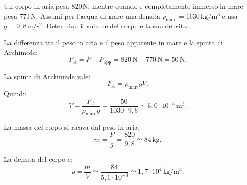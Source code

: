 
\begin{esercizio}
Un corpo in aria pesa $820\,\mathrm{N}$, mentre quando e completamente immerso in mare pesa
$770\,\mathrm{N}$. Assumi per l'acqua di mare una densita
$\rho_{\text{mare}}=1030\,\mathrm{kg/m^3}$ e usa $g=9{,}8\,\mathrm{m/s^2}$.
Determina il volume del corpo e la sua densita.
\end{esercizio}

\begin{soluzione}
La differenza tra il peso in aria e il peso apparente in mare e la spinta di
Archimede:
\[
F_A=P-P_\text{app}
=820\,\mathrm{N}-770\,\mathrm{N}
=50\,\mathrm{N}.
\]

La spinta di Archimede vale:
\[
F_A=\rho_\text{mare}gV.
\]
Quindi:
\[
V=\frac{F_A}{\rho_\text{mare}g}
=\frac{50}{1030\cdot 9{,}8}
\simeq 5{,}0\cdot 10^{-3}\,\mathrm{m^3}.
\]

La massa del corpo si ricava dal peso in aria:
\[
m=\frac{P}{g}
=\frac{820}{9{,}8}
\simeq 84\,\mathrm{kg}.
\]

La densita del corpo e:
\[
\rho=\frac{m}{V}
\simeq \frac{84}{5{,}0\cdot 10^{-3}}
\simeq 1{,}7\cdot 10^4\,\mathrm{kg/m^3}.
\]
\end{soluzione}
